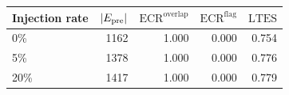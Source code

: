 \begin{tabular}{lrrrr}
\toprule
\textbf{Injection rate} & $|E_{\text{pre}}|$ & $\mathrm{ECR}^{\mathrm{overlap}}$ & $\mathrm{ECR}^{\mathrm{flag}}$ & $\mathrm{LTES}$ \\
\midrule
0\% & 1162 & 1.000 & 0.000 & 0.754 \\
5\% & 1378 & 1.000 & 0.000 & 0.776 \\
20\% & 1417 & 1.000 & 0.000 & 0.779 \\
\bottomrule
\end{tabular}
